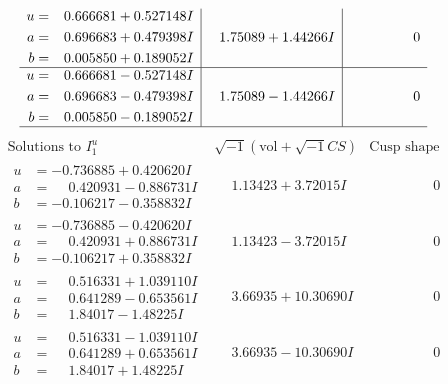 \documentclass[1p]{elsarticle_modified}
\theoremstyle{definition}
\newcommand{\I}{\sqrt{-1}}
\begin{document}
$$\begin{array}{c|c|c}
\begin{aligned}
u &= \phantom{-}0.666681 + 0.527148 I \\
a &= \phantom{-}0.696683 + 0.479398 I \\
b &= \phantom{-}0.005850 + 0.189052 I\end{aligned}
 & \phantom{-}1.75089 + 1.44266 I & \phantom{-0.000000 } 0 \\ \hline\begin{aligned}
u &= \phantom{-}0.666681 - 0.527148 I \\
a &= \phantom{-}0.696683 - 0.479398 I \\
b &= \phantom{-}0.005850 - 0.189052 I\end{aligned}
 & \phantom{-}1.75089 - 1.44266 I & \phantom{-0.000000 } 0\\
 \hline 
 \end{array}$$\newpage$$\begin{array}{c|c|c}  
\text{Solutions to }I^u_{1}& \I (\text{vol} + \sqrt{-1}CS) & \text{Cusp shape}\\
 \hline 
\begin{aligned}
u &= -0.736885 + 0.420620 I \\
a &= \phantom{-}0.420931 - 0.886731 I \\
b &= -0.106217 - 0.358832 I\end{aligned}
 & \phantom{-}1.13423 + 3.72015 I & \phantom{-0.000000 } 0 \\ \hline\begin{aligned}
u &= -0.736885 - 0.420620 I \\
a &= \phantom{-}0.420931 + 0.886731 I \\
b &= -0.106217 + 0.358832 I\end{aligned}
 & \phantom{-}1.13423 - 3.72015 I & \phantom{-0.000000 } 0 \\ \hline\begin{aligned}
u &= \phantom{-}0.516331 + 1.039110 I \\
a &= \phantom{-}0.641289 - 0.653561 I \\
b &= \phantom{-}1.84017 - 1.48225 I\end{aligned}
 & \phantom{-}3.66935 + 10.30690 I & \phantom{-0.000000 } 0 \\ \hline\begin{aligned}
u &= \phantom{-}0.516331 - 1.039110 I \\
a &= \phantom{-}0.641289 + 0.653561 I \\
b &= \phantom{-}1.84017 + 1.48225 I\end{aligned}
 & \phantom{-}3.66935 - 10.30690 I & \phantom{-0.000000 } 0 \\ \hline\begin{aligned}

\end{aligned}
\end{array}$$
\end{document}
